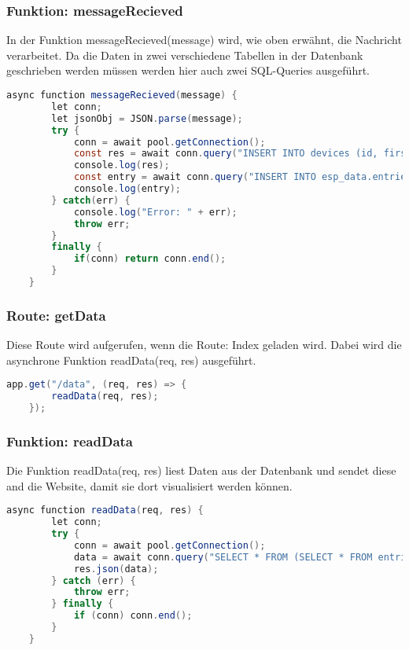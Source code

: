 \subsubsection{Funktion: messageRecieved}
In der Funktion messageRecieved(message) wird, wie oben erwähnt, die Nachricht verarbeitet. Da die Daten in zwei verschiedene Tabellen in der Datenbank geschrieben werden müssen werden hier auch zwei SQL-Queries ausgeführt. 
\begin{lstlisting}[language=java]
	async function messageRecieved(message) {
		let conn;
		let jsonObj = JSON.parse(message);
		try {
			conn = await pool.getConnection();
			const res = await conn.query("INSERT INTO devices (id, first_entry, last_entry) VALUES (?, ?, ?) ON DUPLICATE KEY UPDATE last_entry = VALUES (last_entry);", [jsonObj.device_id, jsonObj.timestamp, jsonObj.timestamp]);
			console.log(res);
			const entry = await conn.query("INSERT INTO esp_data.entries (esp_id, altitude, pressure, temperature, humidity, recorded_at) VALUES (?, ?, ?, ?, ?, ?);", [jsonObj.device_id, jsonObj.altitude, jsonObj.airPressure, jsonObj.temperature, jsonObj.humidity, jsonObj.timestamp]);
			console.log(entry);
		} catch(err) {
			console.log("Error: " + err);
			throw err;
		}
		finally {
			if(conn) return conn.end();
		}
	}
\end{lstlisting}

\subsubsection{Route: getData}
Diese Route wird aufgerufen, wenn die Route: Index geladen wird. Dabei wird die asynchrone Funktion readData(req, res) ausgeführt.
\begin{lstlisting}[language=java]
	app.get("/data", (req, res) => {
		readData(req, res);
	});
\end{lstlisting}

\subsubsection{Funktion: readData}
Die Funktion readData(req, res) liest Daten aus der Datenbank und sendet diese and die Website, damit sie dort visualisiert werden können.
\begin{lstlisting}[language=java]
	async function readData(req, res) {
		let conn;
		try {
			conn = await pool.getConnection();
			data = await conn.query("SELECT * FROM (SELECT * FROM entries ORDER BY recorded_at DESC LIMIT 1000) AS subquery ORDER BY id ASC;");
			res.json(data);
		} catch (err) {
			throw err;
		} finally {
			if (conn) conn.end();
		}
	}
\end{lstlisting}